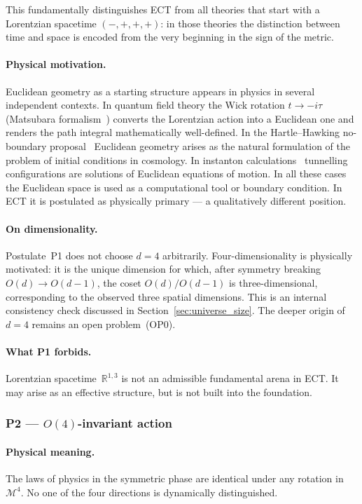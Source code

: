 \documentclass[11pt,a4paper]{article}
\numberwithin{equation}{section}
\begin{document}
This fundamentally distinguishes ECT from all theories that start with
a Lorentzian spacetime $(-,+,+,+)$: in those theories the distinction
between time and space is encoded from the very beginning in the sign
of the metric.

\paragraph{Physical motivation.}
Euclidean geometry as a starting structure appears in physics in
several independent contexts.
In quantum field theory the Wick rotation $t\to-i\tau$
(Matsubara formalism~\cite{Matsubara1955}) converts the Lorentzian
action into a Euclidean one and renders the path integral mathematically
well-defined.
In the Hartle--Hawking no-boundary proposal~\cite{HartleHawking1983}
Euclidean geometry arises as the natural formulation of the problem
of initial conditions in cosmology.
In instanton calculations~\cite{Belavin1975} tunnelling configurations
are solutions of Euclidean equations of motion.
In all these cases the Euclidean space is used as a computational tool
or boundary condition. In ECT it is postulated as physically primary ---
a qualitatively different position.

\paragraph{On dimensionality.}
Postulate~P1 does not choose $d=4$ arbitrarily.
Four-dimensionality is physically motivated: it is the unique dimension
for which, after symmetry breaking $O(d)\to O(d-1)$, the coset
$O(d)/O(d-1)$ is three-dimensional, corresponding to the observed
three spatial dimensions.
This is an internal consistency check discussed in Section~\ref{sec:universe_size}.
The deeper origin of $d=4$ remains an open problem~(OP0).

\paragraph{What P1 forbids.}
Lorentzian spacetime~$\mathbb{R}^{1,3}$ is not an admissible
fundamental arena in ECT. It may arise as an effective structure,
but is not built into the foundation.

\subsubsection*{P2 --- $O(4)$-invariant action}

\paragraph{Physical meaning.}
The laws of physics in the symmetric phase are identical under any
rotation in~$\mathcal{M}^4$. No one of the four directions is
dynamically distinguished.
\end{document}
